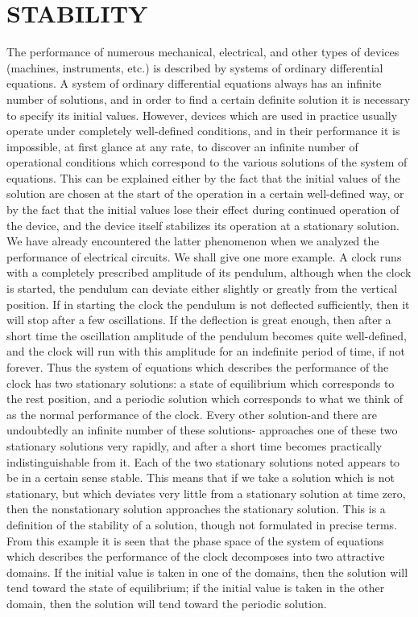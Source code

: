 \documentclass[10pt,a5paper]{book}
\theoremstyle{plain}
\theoremstyle{definition}
\theoremstyle{remark}
\begin{document}
\chapter{STABILITY}
The performance of numerous mechanical, electrical, and other types of devices (machines, instruments, etc.) is described by systems of ordinary differential equations. A system of ordinary differential equations always has an infinite number of solutions, and in order to find a certain definite solution it is necessary to specify its initial values. However, devices which are used in practice usually operate under completely well-defined conditions, and in their performance it is impossible, at first glance at any rate, to discover an infinite number of operational conditions which correspond to the various solutions of the system of equations. This can be explained either by the fact that the initial values of the solution are chosen at the start of the operation in a certain well-defined way, or by the fact that the initial values lose their effect during continued operation of the device, and the device itself stabilizes its operation at a stationary solution. We have already encountered the latter phenomenon when we analyzed the performance of electrical circuits. We shall give one more example. A clock runs with a completely prescribed amplitude of its pendulum, although when the clock is started, the pendulum can deviate either slightly or greatly from the vertical position. If in starting the clock the pendulum is not deflected sufficiently, then it will stop after a few oscillations. If the deflection is great enough, then after a short time the oscillation amplitude of the pendulum becomes quite well-defined, and the clock will run with this amplitude for an indefinite period of time, if not forever. Thus the system of equations which describes the performance of the clock has two stationary solutions: a state of equilibrium which corresponds to the rest position, and a periodic solution which corresponds to what we think of as the normal performance of the clock. Every other solution-and there are undoubtedly an infinite number of these solutions- approaches one of these two stationary solutions very rapidly, and after a short time becomes practically indistinguishable from it. Each of the two stationary solutions noted appears to be in a certain sense stable. This means that if we take a solution which is not stationary, but which deviates very little from a stationary solution at time zero, then the nonstationary solution approaches the stationary solution. This is a definition of the stability of a solution, though not formulated in precise terms. From this example it is seen that the phase space of the system of equations which describes the performance of the clock decomposes into two attractive domains. If the initial value is taken in one of the domains, then the
solution will tend toward the state of equilibrium; if the initial value is taken in the other domain, then the solution will tend toward the periodic solution.
\end{document}

